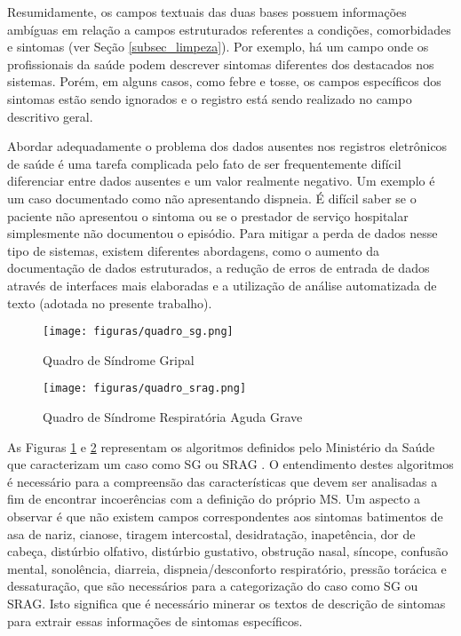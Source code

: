 Resumidamente, os campos textuais das duas bases possuem informações ambíguas em relação a campos estruturados referentes a condições, comorbidades e sintomas (ver Seção \ref{subsec_limpeza}). 
Por exemplo, há um campo onde os profissionais da saúde podem descrever sintomas diferentes dos destacados nos sistemas. 
Porém, em alguns casos, como febre e tosse, os campos específicos dos sintomas estão sendo ignorados e o registro está sendo realizado no campo descritivo geral.

Abordar adequadamente o problema dos dados ausentes nos registros eletrônicos de saúde é uma tarefa complicada pelo fato de ser frequentemente difícil diferenciar entre dados ausentes e um valor realmente negativo. 
Um exemplo é um caso documentado como não apresentando dispneia. 
É difícil saber se o paciente não apresentou o sintoma ou se o prestador de serviço hospitalar simplesmente não documentou o episódio. 
Para mitigar a perda de dados nesse tipo de sistemas, existem diferentes abordagens, como o aumento da documentação de dados estruturados, a redução de erros de entrada de dados através de interfaces mais elaboradas e a utilização de análise automatizada de texto \cite{wells2013strategies} (adotada no presente trabalho). 

\begin{figure}[ht]
\caption{Quadro de Síndrome Gripal}
\centering %
\texttt{[image: figuras/quadro\_sg.png]}
\label{figura_sg}
\end{figure}
    
\begin{figure}[ht]
\caption{Quadro de Síndrome Respiratória Aguda Grave}
\centering %
\texttt{[image: figuras/quadro\_srag.png]}
\label{figura_srag}
\end{figure}
    
As Figuras \ref{figura_sg} e \ref{figura_srag} representam os algoritmos definidos pelo Ministério da Saúde que caracterizam um caso como SG ou SRAG \cite{definicaoMinisterioSaudeSG}.
O entendimento destes algoritmos é necessário para a compreensão das características que devem ser analisadas a fim de encontrar incoerências com a definição do próprio MS. 
Um aspecto a observar é que não existem campos correspondentes aos sintomas batimentos de asa de nariz, cianose, tiragem intercostal, desidratação, inapetência, dor de cabeça, distúrbio olfativo, distúrbio gustativo, obstrução nasal, síncope, confusão mental, sonolência, diarreia, dispneia/desconforto respiratório, pressão torácica e dessaturação, que são necessários para a categorização do caso como SG ou SRAG. 
Isto significa que é necessário minerar os textos de descrição de sintomas para extrair essas informações de sintomas específicos.
    
